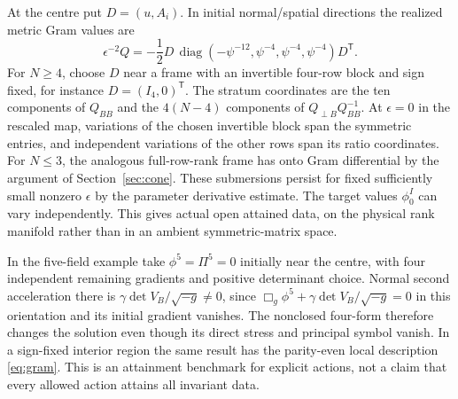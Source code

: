 At the centre put \(D=(u,A_i)\). In initial normal/spatial directions the realized metric Gram values are
\[
 \epsilon^{-2}Q=-\frac12D\,
       \operatorname{diag}(-\psi^{-12},\psi^{-4},\psi^{-4},\psi^{-4})D^{\mathsf T}.
\]
For \(N\ge4\), choose \(D\) near a frame with an invertible four-row block and sign fixed, for instance \(D=(I_4,0)^{\mathsf T}\). The stratum coordinates are the ten components of \(Q_{BB}\) and the \(4(N-4)\) components of \(Q_{\perp B}Q_{BB}^{-1}\). At \(\epsilon=0\) in the rescaled map, variations of the chosen invertible block span the symmetric entries, and independent variations of the other rows span its ratio coordinates. For \(N\le3\), the analogous full-row-rank frame has onto Gram differential by the argument of Section~\ref{sec:cone}. These submersions persist for fixed sufficiently small nonzero \(\epsilon\) by the parameter derivative estimate. The target values \(\phi_0^I\) can vary independently. This gives actual open attained data, on the physical rank manifold rather than in an ambient symmetric-matrix space.

In the five-field example take \(\phi^5=\Pi^5=0\) initially near the centre, with four independent remaining gradients and positive determinant choice. Normal second acceleration there is \(\gamma\det V_B/\sqrt{-g}\ne0\), since
\(\Box_g\phi^5+\gamma\det V_B/\sqrt{-g}=0\) in this orientation and its initial gradient vanishes. The nonclosed four-form therefore changes the solution even though its direct stress and principal symbol vanish. In a sign-fixed interior region the same result has the parity-even local description \eqref{eq:gram}. This is an attainment benchmark for explicit actions, not a claim that every allowed action attains all invariant data.
